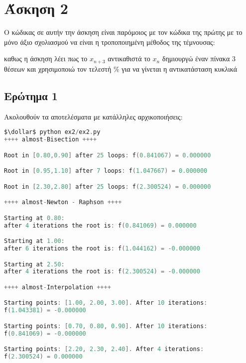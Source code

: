\section{Άσκηση 2}


Ο κώδικας σε αυτήν την άσκηση είναι παρόμοιος με τον κώδικα της πρώτης
με το μόνο άξιο σχολιασμού να είναι η τροποποιημένη μέθοδος της τέμνουσας:


καθως η άσκηση λέει πως το $x_{n+3}$ αντικαθιστά το $x_n$
δημιουργώ έναν πίνακα 3 θέσεων και χρησιμοποιώ τον τελεστή $\%$
για να γίνεται η αντικατάσταση κυκλικά

\subsection{Ερώτημα 1}

Ακολουθούν τα αποτελέσματα με κατάλληλες αρχικοποιήσεις:
\begin{lstlisting}[language=C, mathescape=true]
$\dollar$ python ex2/ex2.py
++++ almost-Bisection ++++

Root in [0.80,0.90] after 25 loops: f(0.841067) = 0.000000

Root in [0.95,1.10] after 7 loops: f(1.047667) = 0.000000

Root in [2.30,2.80] after 25 loops: f(2.300524) = 0.000000

++++ almost-Newton - Raphson ++++

Starting at 0.80:
after 4 iterations the root is: f(0.841069) = 0.000000

Starting at 1.00:
after 6 iterations the root is: f(1.044162) = -0.000000

Starting at 2.50:
after 4 iterations the root is: f(2.300524) = -0.000000

++++ almost-Interpolation ++++

Starting points: [1.00, 2.00, 3.00]. After 10 iterations:
f(1.043381) = -0.000000

Starting points: [0.70, 0.80, 0.90]. After 10 iterations:
f(0.841069) = -0.000000

Starting points: [2.20, 2.30, 2.40]. After 4 iterations:
f(2.300524) = 0.000000
\end{lstlisting}

